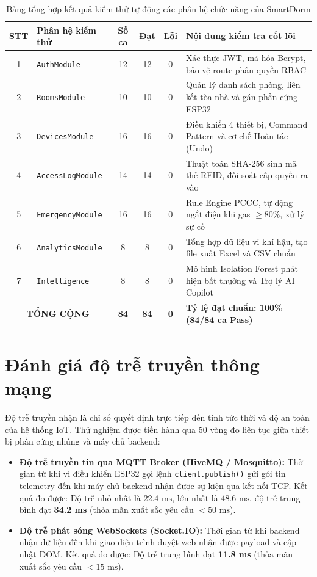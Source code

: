 \begin{table}[H]
\centering
\footnotesize
\begin{tabularx}{\textwidth}{|c|p{3.2cm}|c|c|c|X|}
\hline
\textbf{STT} & \textbf{Phân hệ kiểm thử} & \textbf{Số ca} & \textbf{Đạt} & \textbf{Lỗi} & \textbf{Nội dung kiểm tra cốt lõi} \\
\hline
1 & \texttt{AuthModule} & 12 & 12 & 0 & Xác thực JWT, mã hóa Bcrypt, bảo vệ route phân quyền RBAC \\
\hline
2 & \texttt{RoomsModule} & 10 & 10 & 0 & Quản lý danh sách phòng, liên kết tòa nhà và gán phần cứng ESP32 \\
\hline
3 & \texttt{DevicesModule} & 16 & 16 & 0 & Điều khiển 4 thiết bị, Command Pattern và cơ chế Hoàn tác (Undo) \\
\hline
4 & \texttt{AccessLogModule} & 14 & 14 & 0 & Thuật toán SHA-256 sinh mã thẻ RFID, đối soát cấp quyền ra vào \\
\hline
5 & \texttt{EmergencyModule} & 16 & 16 & 0 & Rule Engine PCCC, tự động ngắt điện khi gas $\ge 80\%$, xử lý sự cố \\
\hline
6 & \texttt{AnalyticsModule} & 8 & 8 & 0 & Tổng hợp dữ liệu vi khí hậu, tạo file xuất Excel và CSV chuẩn \\
\hline
7 & \texttt{Intelligence} & 8 & 8 & 0 & Mô hình Isolation Forest phát hiện bất thường và Trợ lý AI Copilot \\
\hline
\multicolumn{2}{|c|}{\textbf{TỔNG CỘNG}} & \textbf{84} & \textbf{84} & \textbf{0} & \textbf{Tỷ lệ đạt chuẩn: 100\% (84/84 ca Pass)} \\
\hline
\end{tabularx}
\caption{Bảng tổng hợp kết quả kiểm thử tự động các phân hệ chức năng của SmartDorm}
\label{tab:tong_hop_kiem_thu}
\end{table}

\section{Đánh giá độ trễ truyền thông mạng}
\label{sec:danh_gia_do_tre}

Độ trễ truyền nhận là chỉ số quyết định trực tiếp đến tính tức thời và độ an toàn của hệ thống IoT. Thử nghiệm được tiến hành qua 50 vòng đo liên tục giữa thiết bị phần cứng nhúng và máy chủ backend:

\begin{itemize}
    \item \textbf{Độ trễ truyền tin qua MQTT Broker (HiveMQ / Mosquitto):} Thời gian từ khi vi điều khiển ESP32 gọi lệnh \texttt{client.publish()} gửi gói tin telemetry đến khi máy chủ backend nhận được sự kiện qua kết nối TCP. Kết quả đo được: Độ trễ nhỏ nhất là $22.4\text{ ms}$, lớn nhất là $48.6\text{ ms}$, độ trễ trung bình đạt \textbf{34.2 ms} (thỏa mãn xuất sắc yêu cầu $< 50\text{ ms}$).
    \item \textbf{Độ trễ phát sóng WebSockets (Socket.IO):} Thời gian từ khi backend nhận dữ liệu đến khi giao diện trình duyệt web nhận được payload và cập nhật DOM. Kết quả đo được: Độ trễ trung bình đạt \textbf{11.8 ms} (thỏa mãn xuất sắc yêu cầu $< 15\text{ ms}$).
\end{itemize}

